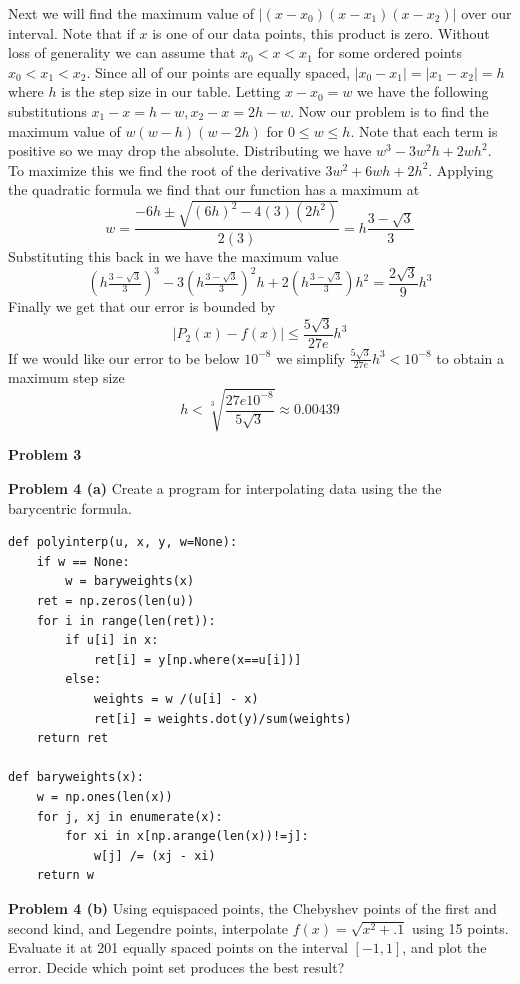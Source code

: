 \documentclass[12pt]{article}
\newcommand{\problem}[1]{\hspace{-4 ex} \large \textbf{Problem #1} }
\begin{document}
	Next we will find the maximum value of $\vert (x-x_0)(x-x_1)(x-x_2) \vert$ over our interval. Note that if $x$ is one of our data points, this product is zero. Without loss of generality we can assume that $x_0 < x < x_1$ for some ordered points $x_0 < x_1 < x_2$. Since all of our points are equally spaced, $\vert x_0 - x_1 \vert = \vert x_1 - x_2 \vert = h$ where $h$ is the step size in our table. Letting $ x-x_0 = w$ we have the following substitutions $ x_1-x = h-w, x_2 - x = 2h - w$. Now our problem is to find the maximum value of $ w(w-h)(w-2h)$ for $ 0 \leq w \leq h$. Note that each term is positive so we may drop the absolute. Distributing we have $w^3 - 3w^2h + 2wh^2$. To maximize this we find the root of the derivative $3w^2 + 6wh + 2h^2$. Applying the quadratic formula we find that our function has a maximum at 
	$$
	w = \frac{-6h \pm \sqrt{(6h)^2 - 4(3)(2h^2)}}{2(3)} = h \frac{3-\sqrt{3}}{3}
	$$
	Substituting this back in we have the maximum value
	$$
	(h \tfrac{3-\sqrt{3}}{3})^3 - 3(h \tfrac{3-\sqrt{3}}{3})^2h + 2(h \tfrac{3-\sqrt{3}}{3})h^2 = \frac{2 \sqrt{3}}{9}h^3
	$$
	Finally we get that our error is bounded by
	$$
	\vert P_2(x) - f(x) \vert \leq \frac{5\sqrt{3}}{27e}h^3
	$$
	If we would like our error to be below $10^{-8}$ we simplify $\frac{5\sqrt{3}}{27e}h^3 < 10^{-8}$ to obtain a maximum step size
	$$
	h < \sqrt[3]{\frac{27e10^{-8}}{5 \sqrt{3}}} \approx 0.00439
	$$
	
\singlespacing
\problem{3}

\problem{4 (a)} Create a program for interpolating data using the the barycentric formula.

	\begin{lstlisting}
def polyinterp(u, x, y, w=None):
	if w == None:
		w = baryweights(x)
	ret = np.zeros(len(u))
	for i in range(len(ret)):
		if u[i] in x:
			ret[i] = y[np.where(x==u[i])]
		else:
			weights = w /(u[i] - x)
			ret[i] = weights.dot(y)/sum(weights)
	return ret

def baryweights(x):
	w = np.ones(len(x))
	for j, xj in enumerate(x):
		for xi in x[np.arange(len(x))!=j]: 
			w[j] /= (xj - xi)
	return w
	\end{lstlisting}

\problem{4 (b)} Using equispaced points, the Chebyshev points of the first and second kind, and Legendre points, interpolate $f(x) = \sqrt{x^2 +.1}$ using 15 points. Evaluate it at 201 equally spaced points on the interval $[-1,1]$, and plot the error. Decide which point set produces the best result?
\end{document}
